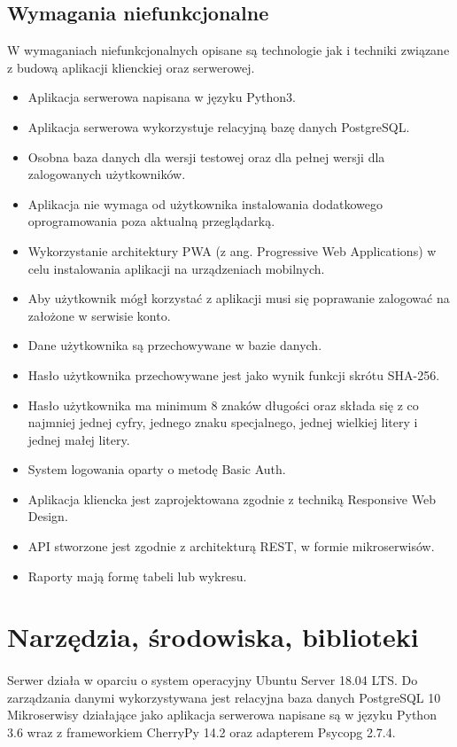 \documentclass{article}
\begin{document}
	\subsection{Wymagania niefunkcjonalne}
	W wymaganiach niefunkcjonalnych opisane są technologie jak i techniki związane z budową aplikacji klienckiej oraz serwerowej.
	\begin{itemize}
		\item Aplikacja serwerowa napisana w języku Python3.
		\item Aplikacja serwerowa wykorzystuje relacyjną bazę danych PostgreSQL.
		\item Osobna baza danych dla wersji testowej oraz dla pełnej wersji dla zalogowanych użytkowników.
		\item Aplikacja nie wymaga od użytkownika instalowania dodatkowego oprogramowania poza aktualną przeglądarką.
		\item Wykorzystanie architektury PWA (z ang. Progressive Web Applications) w celu instalowania aplikacji na urządzeniach mobilnych.
		\item Aby użytkownik mógł korzystać z aplikacji musi się poprawanie zalogować na założone w serwisie konto.
		\item Dane użytkownika są przechowywane w bazie danych.
		\item Hasło użytkownika przechowywane jest jako wynik funkcji skrótu SHA-256.
		\item Hasło użytkownika ma minimum 8 znaków długości oraz składa się z co najmniej jednej cyfry, jednego znaku specjalnego, jednej wielkiej litery i jednej małej litery.
		\item System logowania oparty o metodę Basic Auth.
		\item Aplikacja kliencka jest zaprojektowana zgodnie z techniką Responsive Web Design.
		\item API stworzone jest zgodnie z architekturą REST, w formie mikroserwisów.
		\item Raporty mają formę tabeli lub wykresu.
	\end{itemize}
	\section{Narzędzia, środowiska, biblioteki}
	\paragraph{}Serwer działa w oparciu o system operacyjny Ubuntu Server 18.04 LTS.
	Do zarządzania danymi wykorzystywana jest relacyjna baza danych PostgreSQL 10
	Mikroserwisy działające jako aplikacja serwerowa napisane są w języku Python 3.6 wraz z frameworkiem CherryPy 14.2 oraz adapterem Psycopg 2.7.4.
\end{document}
